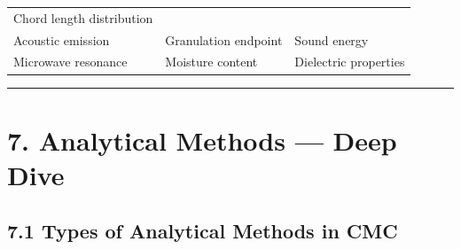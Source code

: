 \documentclass[
  11pt,
  a4paper,
]{report}
\begin{document}
\begin{longtable}[]{@{}lll@{}}
\begin{minipage}[t]{0.39\columnwidth}
Chord length distribution\strut
\end{minipage}\tabularnewline
\begin{minipage}[t]{0.23\columnwidth}\raggedright
Acoustic emission\strut
\end{minipage} & \begin{minipage}[t]{0.30\columnwidth}\raggedright
Granulation endpoint\strut
\end{minipage} & \begin{minipage}[t]{0.39\columnwidth}\raggedright
Sound energy\strut
\end{minipage}\tabularnewline
\begin{minipage}[t]{0.23\columnwidth}\raggedright
Microwave resonance\strut
\end{minipage} & \begin{minipage}[t]{0.30\columnwidth}\raggedright
Moisture content\strut
\end{minipage} & \begin{minipage}[t]{0.39\columnwidth}\raggedright
Dielectric properties\strut
\end{minipage}\tabularnewline
\bottomrule
\end{longtable}

\begin{center}\rule{0.5\linewidth}{0.5pt}\end{center}

\hypertarget{analytical-methods-deep-dive}{%
\section{7. Analytical Methods --- Deep
Dive}\label{analytical-methods-deep-dive}}

\hypertarget{types-of-analytical-methods-in-cmc}{%
\subsection{7.1 Types of Analytical Methods in
CMC}\label{types-of-analytical-methods-in-cmc}}
\end{document}
